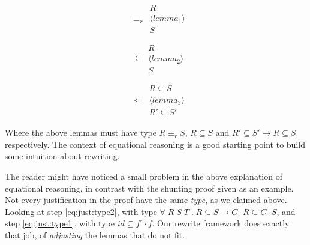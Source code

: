 \begin{center}
\begin{minipage}[t]{0.3\textwidth}
\begin{eqnarray*}
&& R \\
& \equiv_r & \langle lemma_1 \rangle \\
 && S
\end{eqnarray*}
\end{minipage}%
\begin{minipage}[t]{0.3\textwidth}
\begin{eqnarray*}
&& R \\
& \subseteq & \langle lemma_2 \rangle \\
 && S
\end{eqnarray*}
\end{minipage}%
%
\begin{minipage}[t]{0.3\textwidth}
\begin{eqnarray*}
&& R \subseteq S\\
& \Leftarrow & \langle lemma_3 \rangle \\
 && R' \subseteq S'
\end{eqnarray*}
\end{minipage}
\end{center}

Where the above lemmas must have type $R \equiv_r S$, $R \subseteq S$ and $R' \subseteq S' \rightarrow R \subseteq S$
respectively. The context of equational reasoning is a good starting point to build some intuition about rewriting.

The reader might have noticed a small problem in the above explanation of equational reasoning, 
in contrast with the shunting proof given as an example.
Not every justification in the proof have the same \emph{type}, as we claimed above. Looking at
step \ref{eq:just:type2}, with type $\forall\; R\; S\; T\;.\;R \subseteq S \rightarrow C \cdot R \subseteq C \cdot S$,
and step \ref{eq:just:type1}, with type $id \subseteq f^\circ \cdot f$. Our rewrite framework does exactly that job,
of \emph{adjusting} the lemmas that do not fit.




